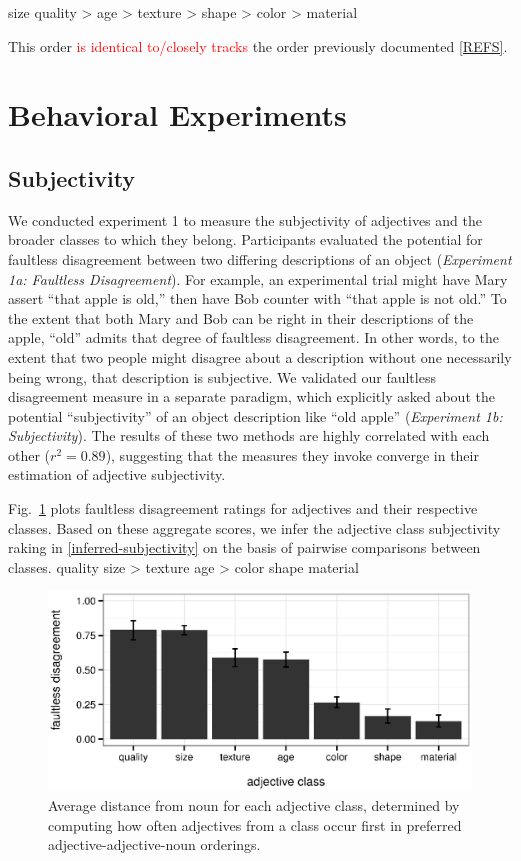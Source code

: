 \documentclass{pnastwo}
\newcommand{\red}[1]{\textcolor{Red}{#1}}
\begin{document}
\begin{article}
\be size \geq quality > age > texture > shape > color > material \label{inferred-order-preferences}\ee

This order \red{is identical to/closely tracks} the order previously documented \ref{REFS}.

\section{Behavioral Experiments}
	
\subsection{Subjectivity} We conducted experiment 1 to measure the subjectivity of adjectives and the broader classes to which they belong. Participants evaluated the potential for faultless disagreement between two differing descriptions of an object (\emph{Experiment 1a: Faultless Disagreement}). For example, an experimental trial might have Mary assert ``that apple is old,'' then have Bob counter with ``that apple is not old.'' To the extent that both Mary and Bob can be right in their descriptions of the apple, ``old'' admits that degree of faultless disagreement. In other words, to the extent that two people might disagree about a description without one necessarily being wrong, that description is subjective. We validated our faultless disagreement measure in a separate paradigm, which explicitly asked about the potential ``subjectivity'' of an object description like ``old apple'' (\emph{Experiment 1b: Subjectivity}). The results of these two methods are highly correlated with each other ($r^{2} = 0.89$), suggesting that the measures they invoke converge in their estimation of adjective subjectivity.

Fig.~\ref{faultless-class} plots faultless disagreement ratings for adjectives and their respective classes. Based on these aggregate scores, we infer the adjective class subjectivity raking in \ref{inferred-subjectivity} on the basis of pairwise comparisons between classes.
\be quality \geq size > texture \geq age > color \geq shape \geq material \label{inferred-subjectivity}\ee

\begin{figure}[h]
	\centering
	\includegraphics[width=.95\linewidth]{plots/faultless_class_plot.eps}
	\caption{Average distance from noun for each adjective class, determined by computing how often adjectives from a class occur first in preferred adjective-adjective-noun orderings.}\label{faultless-class}
\end{figure}



\end{article}
\end{document}
